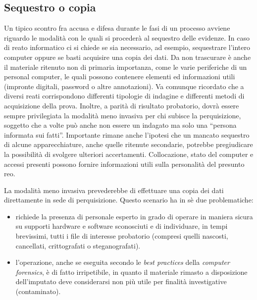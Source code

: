 \subsection{Sequestro o copia}

Un tipico scontro fra accusa e difesa durante le fasi di un processo avviene riguardo le modalità con le quali si procederà al sequestro delle evidenze. \cite{Vierika} In caso di reato informatico ci si chiede se sia necessario, ad esempio, sequestrare l'intero computer oppure se basti acquisire una copia dei dati. Da non trascurare è anche il materiale ritenuto non di primaria importanza, come le varie periferiche di un personal computer, le quali possono contenere elementi ed informazioni utili (impronte digitali, password o altre annotazioni). Va comunque ricordato che a diversi reati corrispondono differenti tipologie di indagine e differenti metodi di acquisizione della prova. Inoltre, a parità di risultato probatorio, dovrà essere sempre privilegiata la modalità meno invasiva per chi subisce la perquisizione, soggetto che a volte può anche non essere un indagato ma solo una ``persona informata sui fatti''. Importante rimane anche l'ipotesi che un mancato sequestro di alcune apparecchiature, anche quelle ritenute secondarie,  potrebbe pregiudicare la possibilità di svolgere ulteriori accertamenti. Collocazione, stato del computer e accessi presenti possono fornire informazioni utili sulla personalità del presunto reo.

La modalità meno invasiva prevederebbe di effettuare una copia dei dati direttamente in sede di perquisizione. Questo scenario ha in sè due problematiche:

\begin{itemize} 

	\item{richiede la presenza di personale esperto in grado di operare in maniera sicura su supporti hardware e software sconosciuti e di individuare, in tempi brevissimi, tutti i file di interesse probatorio (compresi quelli nascosti, cancellati, crittografati o steganografati).}

	\item{l'operazione, anche se eseguita secondo le \textit{best practices} della \textit{computer forensics}, è di fatto irripetibile, in quanto il materiale rimasto a disposizione dell'imputato deve considerarsi non più utile per finalità investigative (contaminato).}

\end{itemize}

